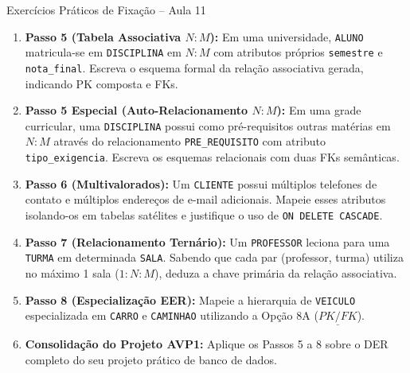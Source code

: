 \begin{frame}{Exercícios Práticos de Fixação -- Aula 11}
  \vspace{-0.18cm}
  \scriptsize
  \begin{enumerate}
    \item \textbf{Passo 5 (Tabela Associativa $N:M$):} Em uma universidade, \texttt{ALUNO} matricula-se em \texttt{DISCIPLINA} em $N:M$ com atributos próprios \texttt{semestre} e \texttt{nota\_final}. Escreva o esquema formal da relação associativa gerada, indicando PK composta e FKs.
    \item \textbf{Passo 5 Especial (Auto-Relacionamento $N:M$):} Em uma grade curricular, uma \texttt{DISCIPLINA} possui como pré-requisitos outras matérias em $N:M$ através do relacionamento \texttt{PRE\_REQUISITO} com atributo \texttt{tipo\_exigencia}. Escreva os esquemas relacionais com duas FKs semânticas.
    \item \textbf{Passo 6 (Multivalorados):} Um \texttt{CLIENTE} possui múltiplos telefones de contato e múltiplos endereços de e-mail adicionais. Mapeie esses atributos isolando-os em tabelas satélites e justifique o uso de \texttt{ON DELETE CASCADE}.
    \item \textbf{Passo 7 (Relacionamento Ternário):} Um \texttt{PROFESSOR} leciona para uma \texttt{TURMA} em determinada \texttt{SALA}. Sabendo que cada par (professor, turma) utiliza no máximo 1 sala ($1:N:M$), deduza a chave primária da relação associativa.
    \item \textbf{Passo 8 (Especialização EER):} Mapeie a hierarquia de \texttt{VEICULO} especializada em \texttt{CARRO} e \texttt{CAMINHAO} utilizando a Opção 8A ($\underline{PK/FK}$).
    \item \textbf{Consolidação do Projeto AVP1:} Aplique os Passos 5 a 8 sobre o DER completo do seu projeto prático de banco de dados.
  \end{enumerate}
\end{frame}

